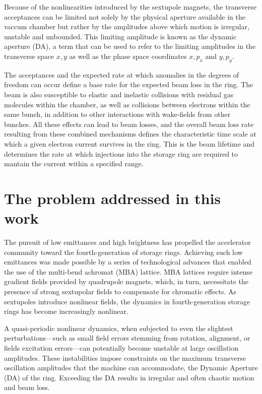 Because of the nonlinearities introduced by the sextupole magnets, the transverse acceptances can be limited not solely by the physical aperture available in the vaccum chamber but rather by the amplitudes above which motion is irregular, unstable and unbounded. This limiting amplitude is known as the dynamic aperture (DA), a term that can be used to refer to the limiting amplitudes in the transverse space $x,y$ as well as the phase space coordinates $x, p_x$ and $y, p_y$.

The acceptances and the expected rate at which anomalies in the degrees of freedom can occur define a base rate for the expected beam loss in the ring. The beam is also susceptible to elastic and inelastic collisions with residual gas molecules within the chamber, as well as collisions between electrons within the same bunch, in addition to other interactions with wake-fields  from other bunches. All these effects can lead to beam losses, and the overall beam loss rate resulting from these combined mechanisms defines the characteristic time scale at which a given electron current survives in the ring. This is the beam lifetime and determines the rate at which injections into the storage ring are required to mantain the current within a specified range.

\section*{The problem addressed in this work}

The pursuit of low emittances and high brightness has propelled the accelerator community toward the fourth-generation of storage rings. Achieving such low emittances was made possible by a series of technological advances that enabled the use of the multi-bend achromat (MBA) lattice\cite{liu_towards_2017,hettel_challenges_2014}. MBA lattices require intense gradient fields provided by quadrupole magnets, which, in turn, necessitate the presence of strong sextupolar fields to compensate for chromatic effects. As sextupoles introduce nonlinear fields, the dynamics in fourth-generation storage rings has become increasingly nonlinear\cite{liu_towards_2017}.

A quasi-periodic nonlinear dynamics, when subjected to even the slightest perturbations—such as small field errors stemming from rotation, alignment, or fields excitation errors—can potentially become unstable at large oscillation amplitudes. These instabilities impose constraints on the maximum transverse oscillation amplitudes that the machine can accommodate, the Dynamic Aperture (DA) of the ring. Exceeding the DA results in irregular and often chaotic motion and beam loss.

